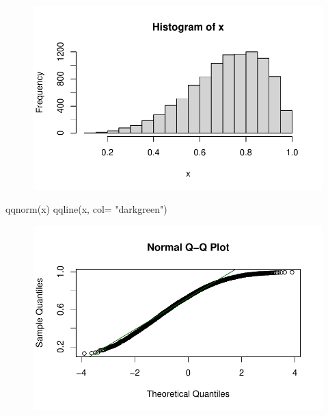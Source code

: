\documentclass[
  letterpaper,
  DIV=11,
  numbers=noendperiod]{scrreprt}
\newenvironment{Shaded}{\begin{snugshade}}{\end{snugshade}}
\newcommand{\AttributeTok}[1]{\textcolor[rgb]{0.40,0.45,0.13}{#1}}
\newcommand{\FunctionTok}[1]{\textcolor[rgb]{0.28,0.35,0.67}{#1}}
\newcommand{\NormalTok}[1]{\textcolor[rgb]{0.00,0.23,0.31}{#1}}
\newcommand{\StringTok}[1]{\textcolor[rgb]{0.13,0.47,0.30}{#1}}
\begin{document}
\begin{figure}[H]

{\centering \includegraphics{methods_files/figure-pdf/unnamed-chunk-2-1.pdf}

}

\end{figure}

\begin{Shaded}
\begin{Highlighting}[]
\FunctionTok{qqnorm}\NormalTok{(x)}
\FunctionTok{qqline}\NormalTok{(x, }\AttributeTok{col=} \StringTok{"darkgreen"}\NormalTok{)}
\end{Highlighting}
\end{Shaded}

\begin{figure}[H]

{\centering \includegraphics{methods_files/figure-pdf/unnamed-chunk-2-2.pdf}

}

\end{figure}
\end{document}
